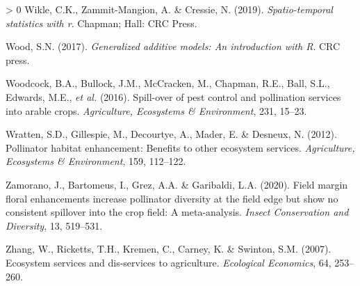 \documentclass[]{elsarticle} %
\newlength{\cslhangindent}
\newenvironment{CSLReferences}[3] %
 {%
  \setlength{\parindent}{0pt}
  \ifodd #1 \everypar{\setlength{\hangindent}{\cslhangindent}}\ignorespaces\fi
  \ifnum #2 > 0
  \setlength{\parskip}{#2\baselineskip}
  \fi
 }%
 {}
\begin{document}
\begin{CSLReferences}{1}{0}
\leavevmode\hypertarget{ref-wickle2019}{}%
Wikle, C.K., Zammit-Mangion, A. \& Cressie, N. (2019). \emph{Spatio-temporal statistics with r}. Chapman; Hall: CRC Press.

\leavevmode\hypertarget{ref-wood2017}{}%
Wood, S.N. (2017). \emph{Generalized additive models: An introduction with {R}}. CRC press.

\leavevmode\hypertarget{ref-woodcock2016}{}%
Woodcock, B.A., Bullock, J.M., McCracken, M., Chapman, R.E., Ball, S.L., Edwards, M.E., \emph{et al.} (2016). Spill-over of pest control and pollination services into arable crops. \emph{Agriculture, Ecosystems \& Environment}, 231, 15--23.

\leavevmode\hypertarget{ref-wratten2012}{}%
Wratten, S.D., Gillespie, M., Decourtye, A., Mader, E. \& Desneux, N. (2012). Pollinator habitat enhancement: Benefits to other ecosystem services. \emph{Agriculture, Ecosystems {\&} Environment}, 159, 112--122.

\leavevmode\hypertarget{ref-zamorano2020}{}%
Zamorano, J., Bartomeus, I., Grez, A.A. \& Garibaldi, L.A. (2020). Field margin floral enhancements increase pollinator diversity at the field edge but show no consistent spillover into the crop field: A meta-analysis. \emph{Insect Conservation and Diversity}, 13, 519--531.

\leavevmode\hypertarget{ref-zhang2007}{}%
Zhang, W., Ricketts, T.H., Kremen, C., Carney, K. \& Swinton, S.M. (2007). Ecosystem services and dis-services to agriculture. \emph{Ecological Economics}, 64, 253--260.

\end{CSLReferences}
\end{document}
